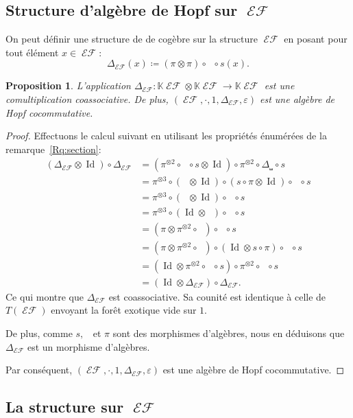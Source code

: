 \documentclass[french]{article}
\theoremstyle{definition}
\theoremstyle{plain}
\newtheorem{Prop}[defi]{Proposition}
\newcommand{\e}{\varepsilon}
\newcommand{\K}{\mathbb{K}}
\DeclareMathOperator{\Dsh}{{\Delta_{\shuffle}}}
\DeclareMathOperator{\EF}{\mathcal{EF}}
\DeclareMathOperator{\Id}{Id}
\begin{document}
\subsection{Structure d'algèbre de Hopf sur $\EF$}

On peut définir une structure de de cogèbre sur la structure $\EF$ en posant pour tout élément $x\in\EF$:
\[
\Delta_{\EF}(x)\coloneqq(\pi\otimes \pi) \circ \Dsh \circ s(x). 
\]

\begin{Prop}
	L'application $\Delta_{\EF}:\K\EF\otimes \K\EF \rightarrow \K\EF$ est une comultiplication coassociative. De plus, $(\EF,\cdot, 1, \Delta_{\EF}, \e)$ est une algèbre de Hopf cocommutative.
\end{Prop}
\begin{proof}
 	Effectuons le calcul suivant en utilisant les propriétés énumérées de la remarque~\ref{Rq:section}:
	\begin{align*}
		(\Delta_{\EF} \otimes \Id)\circ \Delta_{\EF}&=(\pi^{\otimes 2} \circ \Dsh \circ s \otimes \Id) \circ \pi^{\otimes 2} \circ \Delta_{\shuffle} \circ s \\
		&=\pi^{\otimes 3}\circ (\Dsh\otimes \Id)\circ (s\circ \pi \otimes \Id)\circ \Dsh \circ s \\
		&=\pi^{\otimes 3}\circ (\Dsh\otimes \Id)\circ \Dsh \circ s \\
		&=\pi^{\otimes 3}\circ (\Id\otimes \Dsh)\circ \Dsh \circ s \\
		&=(\pi \otimes \pi^{\otimes 2}\circ \Dsh) \circ \Dsh \circ s \\
		&=(\pi \otimes \pi^{\otimes 2}\circ \Dsh) \circ (\Id\otimes s \circ \pi) \circ \Dsh \circ s \\
		&=(\Id \otimes \pi^{\otimes 2}\circ \Dsh \circ s) \circ \pi^{\otimes 2}\circ \Dsh \circ s \\
		&= (\Id \otimes \Delta_{\EF})\circ \Delta_{\EF}.
	\end{align*}
	Ce qui montre que $\Delta_{\EF}$ est coassociative. Sa counité est identique à celle de $T(\EF)$ envoyant la forêt exotique vide sur $1$.
	
	De plus, comme $s, \Dsh$ et $\pi$ sont des morphismes d'algèbres, nous en déduisons que $\Delta_{\EF}$ est un morphisme d'algèbres.
	
	Par conséquent, $(\EF,\cdot, 1, \Delta_{\EF}, \e)$ est une algèbre de Hopf cocommutative. 
\end{proof}

\subsection{La structure \PH{} sur $\EF{}$}
\end{document}
